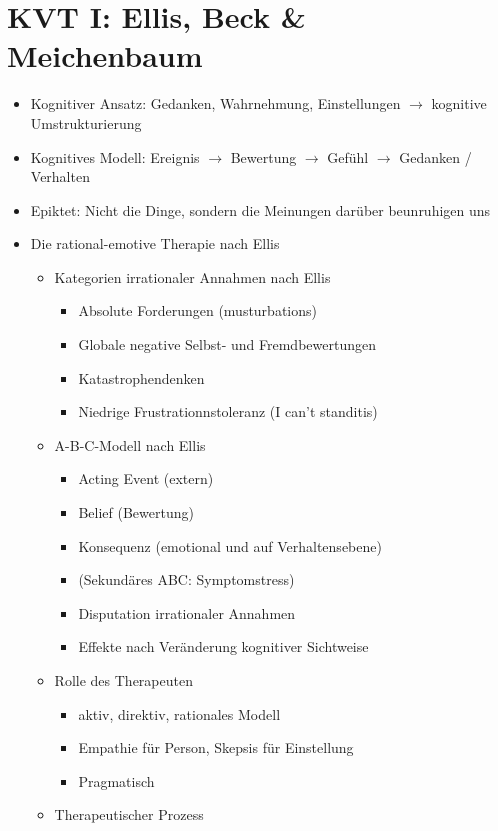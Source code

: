 \documentclass[11pt, paper=a4, twocolumn]{scrartcl}
\begin{document}
	\section{KVT I: Ellis, Beck \& Meichenbaum}
		\begin{itemize}
			\item Kognitiver Ansatz: Gedanken, Wahrnehmung, Einstellungen $\rightarrow$ kognitive Umstrukturierung
			\item Kognitives Modell: Ereignis $\rightarrow$ Bewertung $\rightarrow$ Gefühl $\rightarrow$ Gedanken / Verhalten
			\item Epiktet: Nicht die Dinge, sondern die Meinungen darüber beunruhigen uns
			\item Die rational-emotive Therapie nach Ellis
				\begin{itemize}
					\item Kategorien irrationaler Annahmen nach Ellis
						\begin{itemize}
							\item Absolute Forderungen (musturbations)
							\item Globale negative Selbst- und Fremdbewertungen
							\item Katastrophendenken
							\item Niedrige Frustrationnstoleranz (I can't standitis)
						\end{itemize}
					\item A-B-C-Modell nach Ellis
						\begin{itemize}
							\item Acting Event (extern)
							\item Belief (Bewertung)
							\item Konsequenz (emotional und auf Verhaltensebene)
							\item (Sekundäres ABC: Symptomstress)
							\item Disputation irrationaler Annahmen
							\item Effekte nach Veränderung kognitiver Sichtweise
						\end{itemize}
					\item Rolle des Therapeuten
						\begin{itemize}
							\item aktiv, direktiv, rationales Modell
							\item Empathie für Person, Skepsis für Einstellung
							\item Pragmatisch
						\end{itemize}
					\item Therapeutischer Prozess

\end{itemize}
\end{itemize}
\end{document}
